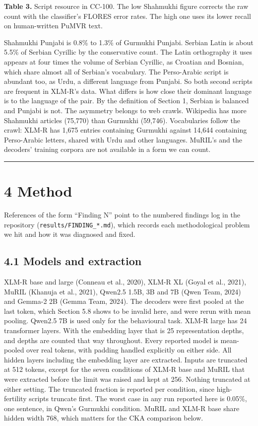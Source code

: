 \textbf{Table 3.} Script resource in CC-100. The low Shahmukhi figure
corrects the raw count with the classifier's FLORES error rates. The
high one uses its lower recall on human-written PuMVR text.

Shahmukhi Punjabi is 0.8\% to 1.3\% of Gurmukhi Punjabi. Serbian Latin
is about 5.5\% of Serbian Cyrillic by the conservative count. The Latin
orthography it uses appears at four times the volume of Serbian
Cyrillic, as Croatian and Bosnian, which share almost all of Serbian's
vocabulary. The Perso-Arabic script is abundant too, as Urdu, a
different language from Punjabi. So both second scripts are frequent in
XLM-R's data. What differs is how close their dominant language is to
the language of the pair. By the definition of Section 1, Serbian is
balanced and Punjabi is not. The asymmetry belongs to web crawls.
Wikipedia has more Shahmukhi articles (75,770) than Gurmukhi (59,746).
Vocabularies follow the crawl: XLM-R has 1,675 entries containing
Gurmukhi against 14,644 containing Perso-Arabic letters, shared with
Urdu and other languages. MuRIL's and the decoders' training corpora are
not available in a form we can count.

\begin{center}\rule{0.5\linewidth}{0.5pt}\end{center}

\hypertarget{method}{%
\section{4 Method}\label{method}}

References of the form ``Finding N'' point to the numbered findings log
in the repository (\texttt{results/FINDING\_*.md}), which records each
methodological problem we hit and how it was diagnosed and fixed.

\hypertarget{models-and-extraction}{%
\subsection{4.1 Models and extraction}\label{models-and-extraction}}

XLM-R base and large (Conneau et al., 2020), XLM-R XL (Goyal et al.,
2021), MuRIL (Khanuja et al., 2021), Qwen2.5 1.5B, 3B and 7B (Qwen Team,
2024) and Gemma-2 2B (Gemma Team, 2024). The decoders were first pooled
at the last token, which Section 5.8 shows to be invalid here, and were
rerun with mean pooling. Qwen2.5 7B is used only for the behavioural
task. XLM-R large has 24 transformer layers. With the embedding layer
that is 25 representation depths, and depths are counted that way
throughout. Every reported model is mean-pooled over real tokens, with
padding handled explicitly on either side. All hidden layers including
the embedding layer are extracted. Inputs are truncated at 512 tokens,
except for the seven conditions of XLM-R base and MuRIL that were
extracted before the limit was raised and kept at 256. Nothing truncated
at either setting. The truncated fraction is reported per condition,
since high-fertility scripts truncate first. The worst case in any run
reported here is 0.05\%, one sentence, in Qwen's Gurmukhi condition.
MuRIL and XLM-R base share hidden width 768, which matters for the CKA
comparison below.

